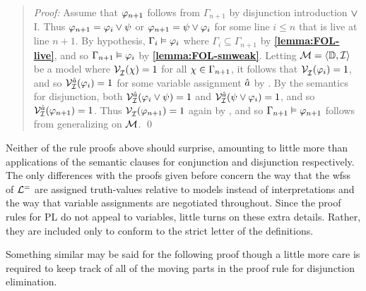 \begin{quote} 
  \textit{Proof:} Assume that $\varphi_{n+1}$ follows from $\Gamma_{n+1}$ by disjunction introduction $\vee$I.
  Thus $\varphi_{n+1}=\varphi_i\vee\psi$ or $\varphi_{n+1}=\psi\vee\varphi_i$ for some line $i\leq n$ that is live at line $n+1$.
  By hypothesis, $\Gamma_i\vDash \varphi_i$ where $\Gamma_i\subseteq \Gamma_{n+1}$ by \textbf{\ref{lemma:FOL-live}}, and so $\Gamma_{n+1} \vDash \varphi_i$ by \textbf{\ref{lemma:FOL-smweak}}.
  Letting $\mathcal{M}=\langle\mathbb{D},\mathcal{I}\rangle$ be a model where $\mathcal{V}_{\mathcal{I}}^{}(\chi) = 1$ for all $\chi \in \Gamma_{n+1}$, it follows that $\mathcal{V}_{\mathcal{I}}^{}(\varphi_i) = 1$, and so $\mathcal{V}_{\mathcal{I}}^{\hat{a}}(\varphi_i)=1$ for some variable assignment $\hat{a}$ by .
  By the semantics for disjunction, both $\mathcal{V}_{\mathcal{I}}^{\hat{a}}(\varphi_{i}\vee\psi)=1$ and $\mathcal{V}_{\mathcal{I}}^{\hat{a}}(\psi\vee\varphi_{i})=1$, and so $\mathcal{V}_{\mathcal{I}}^{\hat{a}}(\varphi_{n+1})=1$.
  Thus $\mathcal{V}_{\mathcal{I}}^{}(\varphi_{n+1})=1$ again by , and so $\Gamma_{n+1} \vDash \varphi_{n+1}$ follows from generalizing on $\mathcal{M}$.
  \qed
\end{quote}




Neither of the rule proofs above should surprise, amounting to little more than applications of the semantic clauses for conjunction and disjunction respectively.
The only differences with the proofs given before concern the way that the wfss of $\mathcal{L}^{=}$ are assigned truth-values relative to models instead of interpretations and the way that variable assignments are negotiated throughout.
Since the proof rules for PL do not appeal to variables, little turns on these extra details.
Rather, they are included only to conform to the strict letter of the definitions.

Something similar may be said for the following proof though a little more care is required to keep track of all of the moving parts in the proof rule for disjunction elimination.


